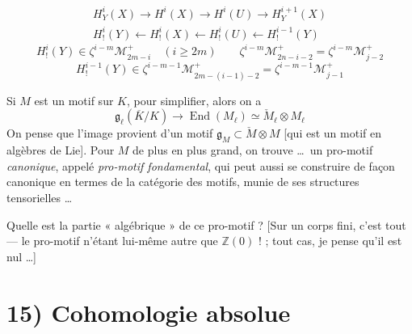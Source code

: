 \documentclass[11pt,a4paper]{article}
\begin{document}
\[
  \begin{gathered}
    H^{i}_{Y}(X) \to H^{i}(X) \to H^{i}(U) \to H^{i+1}_{Y}(X) \\
    H^{i}_{!}(Y) \leftarrow H^{i}_{!}(X) \leftarrow H^{i}_{!}(U) \leftarrow H^{i-1}_{!}(Y)
  \end{gathered}
\]
\[
  H^{i}_{!}(Y) \in \zeta^{i-m} \mathcal{M}^{+}_{2m-i} \quad (i \geq 2m) \qquad
  \zeta^{i-m} \mathcal{M}^{+}_{2n-i-2} = \zeta^{i-m} \mathcal{M}^{+}_{j-2}
\]
\[
  H^{i-1}_{!}(Y) \in \zeta^{i-m-1} \mathcal{M}^{+}_{2m-(i-1)-2} = \zeta^{i-m-1} \mathcal{M}^{+}_{j-1}
\]

Si $M$ est un motif sur $K$,  pour simplifier, alors on a
\[
  \mathfrak{g}_{\ell}(\overline{K}/K) \longrightarrow \operatorname{End}(M_{\ell}) \simeq \check{M}_{\ell} \otimes M_{\ell}
\]
 On pense que l'image provient d'un motif $\mathfrak{g}_{M} \subset \check{M} \otimes M$  [qui est un motif en algèbres de Lie]. Pour $M$ de plus en plus grand, on trouve \ldots\ un pro-motif  \emph{canonique}, appelé \emph{pro-motif fondamental}, qui peut aussi se construire de façon canonique en termes de la catégorie des motifs, munie de ses structures tensorielles \ldots

Quelle est la partie « algébrique » de ce pro-motif ? [Sur un corps fini, c'est tout --- le pro-motif n'étant lui-même autre que $\mathbb{Z}(0)$ ! ; \struck{\ill{}}  tout  \struck{\ill{}} cas, je pense qu'il est nul \ldots]

\section{15) Cohomologie absolue}
\end{document}
